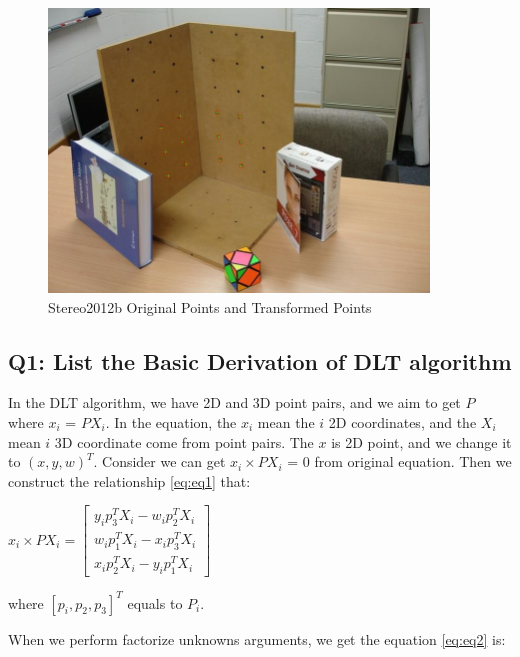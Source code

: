 \documentclass[12pt]{article}
\begin{document}
\begin{figure}[h]
    \centering
    \includegraphics[width=0.9\textwidth]{stereo2012bResult.jpg}
    \caption{Stereo2012b Original Points and Transformed Points}
    \label{fig:stereo2012bResult}
\end{figure}

\subsection{Q1: List the Basic Derivation of DLT algorithm}

In the DLT algorithm, we have 2D and 3D point pairs, and we aim to get $P$ where $x_{i}$ = $PX_{i}$. In the equation, the $x_{i}$ mean the $i$ 2D coordinates, and the $X_{i}$ mean $i$ 3D coordinate come from point pairs. The $x$ is 2D point, and we change it to $(x,y,w)^{T}$. Consider we can get $x_{i} \times PX_{i}$ = $0$ from original equation. Then we construct the relationship \ref{eq:eq1} that:

\begin{center}
\label{eq:eq1}
$x_{i} \times PX_{i} = \begin{bmatrix} y_{i}p_{3}^{T}X_{i} - w_{i}p_{2}^{T}X_{i} \\ w_{i}p_{1}^{T}X_{i} - x_{i}p_{3}^{T}X_{i} \\ x_{i}p_{2}^{T}X_{i} - y_{i}p_{1}^{T}X_{i} \end{bmatrix}$
\end{center}

where $[p_{i}, p_{2}, p_{3}]^{T}$ equals to $P_{i}$.

When we perform factorize unknowns arguments, we get the equation \ref{eq:eq2} is:
\end{document}
